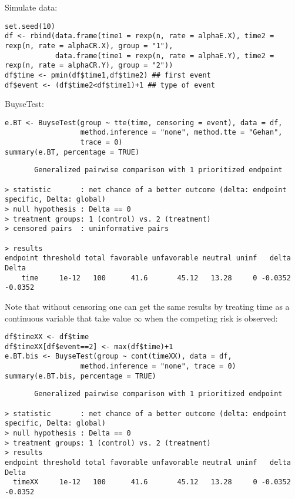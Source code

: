 \documentclass[12pt]{article}
\begin{document}
Simulate data:
\lstset{language=r,label= ,caption= ,captionpos=b,numbers=none}
\begin{lstlisting}
set.seed(10)
df <- rbind(data.frame(time1 = rexp(n, rate = alphaE.X), time2 = rexp(n, rate = alphaCR.X), group = "1"),
			data.frame(time1 = rexp(n, rate = alphaE.Y), time2 = rexp(n, rate = alphaCR.Y), group = "2"))
df$time <- pmin(df$time1,df$time2) ## first event
df$event <- (df$time2<df$time1)+1 ## type of event
\end{lstlisting}

BuyseTest:
\lstset{language=r,label= ,caption= ,captionpos=b,numbers=none}
\begin{lstlisting}
e.BT <- BuyseTest(group ~ tte(time, censoring = event), data = df,
				  method.inference = "none", method.tte = "Gehan",
				  trace = 0)
summary(e.BT, percentage = TRUE)
\end{lstlisting}

\begin{verbatim}
       Generalized pairwise comparison with 1 prioritized endpoint

> statistic       : net chance of a better outcome (delta: endpoint specific, Delta: global) 
> null hypothesis : Delta == 0 
> treatment groups: 1 (control) vs. 2 (treatment) 
> censored pairs  : uninformative pairs

> results
endpoint threshold total favorable unfavorable neutral uninf   delta   Delta
    time     1e-12   100      41.6       45.12   13.28     0 -0.0352 -0.0352
\end{verbatim}

Note that without censoring one can get the same results by treating
time as a continuous variable that take value \(\infty\) when the
competing risk is observed:
\lstset{language=r,label= ,caption= ,captionpos=b,numbers=none}
\begin{lstlisting}
df$timeXX <- df$time
df$timeXX[df$event==2] <- max(df$time)+1
e.BT.bis <- BuyseTest(group ~ cont(timeXX), data = df,
				  method.inference = "none", trace = 0)
summary(e.BT.bis, percentage = TRUE)
\end{lstlisting}

\begin{verbatim}
       Generalized pairwise comparison with 1 prioritized endpoint

> statistic       : net chance of a better outcome (delta: endpoint specific, Delta: global) 
> null hypothesis : Delta == 0 
> treatment groups: 1 (control) vs. 2 (treatment) 
> results
endpoint threshold total favorable unfavorable neutral uninf   delta   Delta
  timeXX     1e-12   100      41.6       45.12   13.28     0 -0.0352 -0.0352
\end{verbatim}
\end{document}

